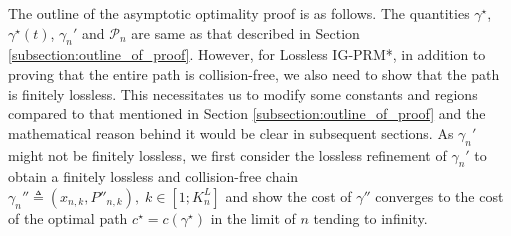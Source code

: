 \documentclass[Afour,sageh,times]{sagej}
\begin{document}
The outline of the asymptotic optimality proof is as follows.
The quantities $\gamma^\star$, $\gamma^\star(t)$, $\gamma_n'$ and $\mathcal{P}_n$ are same as that described in Section \ref{subsection:outline_of_proof}. However, for Lossless IG-PRM*, in addition to proving that the entire path is collision-free, we also need to show that the path is finitely lossless. This necessitates us to modify some constants and regions compared to that mentioned in Section \ref{subsection:outline_of_proof} and the mathematical reason behind it would be clear in subsequent sections.
As $\gamma_n'$ might not be finitely lossless, we first consider the lossless refinement of $\gamma_n'$ to obtain a finitely lossless and collision-free chain $\gamma_n''\triangleq (x_{n,k},P''_{n,k}),\;k\in[1;K^L_n]$ and show the cost of $\gamma''$ converges to the cost of the optimal path $c^\star=c(\gamma^\star)$ in the limit of $n$ tending to infinity.
\end{document}
